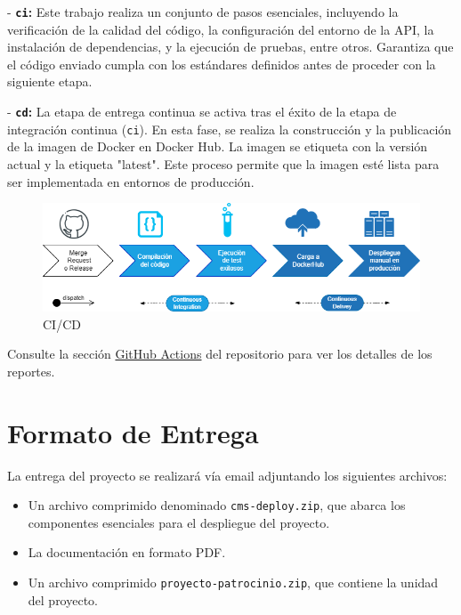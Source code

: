 - \textbf{\texttt{ci}:} Este trabajo realiza un conjunto de pasos esenciales, incluyendo la verificación de la calidad del código, la configuración del entorno de la API, la instalación de dependencias, y la ejecución de pruebas, entre otros. Garantiza que el código enviado cumpla con los estándares definidos antes de proceder con la siguiente etapa.

- \textbf{\texttt{cd}:} La etapa de entrega continua se activa tras el éxito de la etapa de integración continua (\texttt{ci}). En esta fase, se realiza la construcción y la publicación de la imagen de Docker en Docker Hub. La imagen se etiqueta con la versión actual y la etiqueta "latest". Este proceso permite que la imagen esté lista para ser implementada en entornos de producción.



\begin{figure}[H]
    \centering
    \includegraphics[width=1\linewidth]{fig/cicd.png}
    \caption{CI/CD}
    \label{fig:ci-cd}
\end{figure}

Consulte la sección \href{https://github.com/proyecto-patrocinio/proyecto-patrocinio/actions}{GitHub Actions} del repositorio para ver los detalles de los reportes.




\section{Formato de Entrega}
La entrega del proyecto se realizará vía email adjuntando los siguientes archivos:

\begin{itemize}
    \item Un archivo comprimido denominado \texttt{cms-deploy.zip}, que abarca los componentes esenciales para el despliegue del proyecto.
    \item La documentación en formato PDF.
    \item Un archivo comprimido \texttt{proyecto-patrocinio.zip}, que contiene la unidad del proyecto.
\end{itemize}

